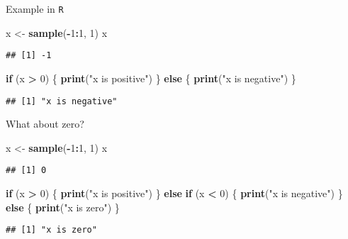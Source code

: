 \documentclass[ignorenonframetext,]{beamer}
\newenvironment{Shaded}{\begin{snugshade}}{\end{snugshade}}
\newcommand{\KeywordTok}[1]{\textcolor[rgb]{0.13,0.29,0.53}{\textbf{#1}}}
\newcommand{\DecValTok}[1]{\textcolor[rgb]{0.00,0.00,0.81}{#1}}
\newcommand{\StringTok}[1]{\textcolor[rgb]{0.31,0.60,0.02}{#1}}
\newcommand{\ControlFlowTok}[1]{\textcolor[rgb]{0.13,0.29,0.53}{\textbf{#1}}}
\newcommand{\OperatorTok}[1]{\textcolor[rgb]{0.81,0.36,0.00}{\textbf{#1}}}
\newcommand{\NormalTok}[1]{#1}
\begin{document}
\begin{frame}[fragile]{Example in \texttt{R}}

\begin{Shaded}
\begin{Highlighting}[]
\NormalTok{x <-}\StringTok{ }\KeywordTok{sample}\NormalTok{(}\OperatorTok{-}\DecValTok{1}\OperatorTok{:}\DecValTok{1}\NormalTok{, }\DecValTok{1}\NormalTok{)}
\NormalTok{x}
\end{Highlighting}
\end{Shaded}

\begin{verbatim}
## [1] -1
\end{verbatim}

\begin{Shaded}
\begin{Highlighting}[]
\ControlFlowTok{if}\NormalTok{ (x }\OperatorTok{>}\StringTok{ }\DecValTok{0}\NormalTok{) \{}
  \KeywordTok{print}\NormalTok{(}\StringTok{"x is positive"}\NormalTok{)}
\NormalTok{\} }\ControlFlowTok{else}\NormalTok{ \{ }
  \KeywordTok{print}\NormalTok{(}\StringTok{"x is negative"}\NormalTok{)}
\NormalTok{\}}
\end{Highlighting}
\end{Shaded}

\begin{verbatim}
## [1] "x is negative"
\end{verbatim}

\end{frame}

\begin{frame}[fragile]{What about zero?}

\begin{Shaded}
\begin{Highlighting}[]
\NormalTok{x <-}\StringTok{ }\KeywordTok{sample}\NormalTok{(}\OperatorTok{-}\DecValTok{1}\OperatorTok{:}\DecValTok{1}\NormalTok{, }\DecValTok{1}\NormalTok{)}
\NormalTok{x}
\end{Highlighting}
\end{Shaded}

\begin{verbatim}
## [1] 0
\end{verbatim}

\begin{Shaded}
\begin{Highlighting}[]
\ControlFlowTok{if}\NormalTok{ (x }\OperatorTok{>}\StringTok{ }\DecValTok{0}\NormalTok{) \{}
  \KeywordTok{print}\NormalTok{(}\StringTok{"x is positive"}\NormalTok{)}
\NormalTok{\} }\ControlFlowTok{else} \ControlFlowTok{if}\NormalTok{ (x }\OperatorTok{<}\StringTok{ }\DecValTok{0}\NormalTok{) \{ }
  \KeywordTok{print}\NormalTok{(}\StringTok{"x is negative"}\NormalTok{)  }
\NormalTok{\} }\ControlFlowTok{else}\NormalTok{ \{}
  \KeywordTok{print}\NormalTok{(}\StringTok{"x is zero"}\NormalTok{)}
\NormalTok{\}}
\end{Highlighting}
\end{Shaded}

\begin{verbatim}
## [1] "x is zero"
\end{verbatim}

\end{frame}
\end{document}
